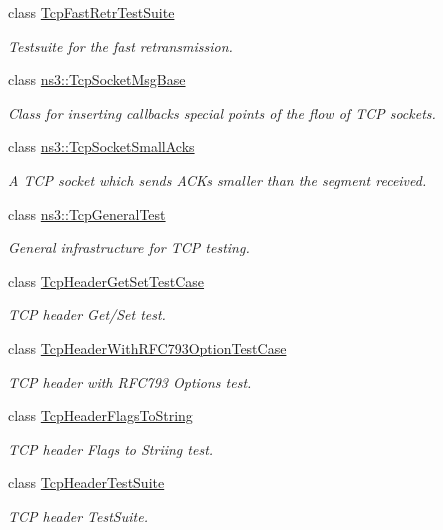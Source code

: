 \begin{DoxyCompactItemize}
class \hyperlink{classTcpFastRetrTestSuite}{Tcp\+Fast\+Retr\+Test\+Suite}
\begin{DoxyCompactList}\small\item\em Testsuite for the fast retransmission. \end{DoxyCompactList}\item 
class \hyperlink{classns3_1_1TcpSocketMsgBase}{ns3\+::\+Tcp\+Socket\+Msg\+Base}
\begin{DoxyCompactList}\small\item\em Class for inserting callbacks special points of the flow of T\+CP sockets. \end{DoxyCompactList}\item 
class \hyperlink{classns3_1_1TcpSocketSmallAcks}{ns3\+::\+Tcp\+Socket\+Small\+Acks}
\begin{DoxyCompactList}\small\item\em A T\+CP socket which sends A\+C\+Ks smaller than the segment received. \end{DoxyCompactList}\item 
class \hyperlink{classns3_1_1TcpGeneralTest}{ns3\+::\+Tcp\+General\+Test}
\begin{DoxyCompactList}\small\item\em General infrastructure for T\+CP testing. \end{DoxyCompactList}\item 
class \hyperlink{classTcpHeaderGetSetTestCase}{Tcp\+Header\+Get\+Set\+Test\+Case}
\begin{DoxyCompactList}\small\item\em T\+CP header Get/\+Set test. \end{DoxyCompactList}\item 
class \hyperlink{classTcpHeaderWithRFC793OptionTestCase}{Tcp\+Header\+With\+R\+F\+C793\+Option\+Test\+Case}
\begin{DoxyCompactList}\small\item\em T\+CP header with R\+F\+C793 Options test. \end{DoxyCompactList}\item 
class \hyperlink{classTcpHeaderFlagsToString}{Tcp\+Header\+Flags\+To\+String}
\begin{DoxyCompactList}\small\item\em T\+CP header Flags to Striing test. \end{DoxyCompactList}\item 
class \hyperlink{classTcpHeaderTestSuite}{Tcp\+Header\+Test\+Suite}
\begin{DoxyCompactList}\small\item\em T\+CP header Test\+Suite. \end{DoxyCompactList}\item 

\end{DoxyCompactItemize}
